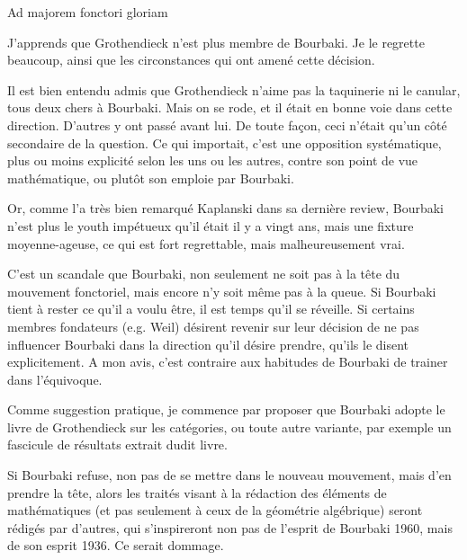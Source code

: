 \begin{center}Ad majorem fonctori gloriam\end{center}

J'apprends que Grothendieck n'est plus membre de Bourbaki. Je le regrette
beaucoup, ainsi que les circonstances qui ont amené cette décision.

Il est bien entendu admis que Grothendieck n'aime pas la taquinerie ni le
canular, tous deux chers à Bourbaki. Mais on se rode, et il était en bonne
voie dans cette direction. D'autres y ont passé avant lui. De toute façon,
ceci n'était qu'un côté secondaire de la question. Ce qui importait, c'est
une opposition systématique, plus ou moins explicité selon les uns ou les
autres, contre son point de vue mathématique, ou plutôt son emploie par
Bourbaki.

Or, comme l'a très bien remarqué Kaplanski dans sa dernière review,
Bourbaki n'est plus le youth impétueux qu'il était il y a vingt ans, mais une
fixture moyenne-ageuse, ce qui est fort regrettable, mais malheureusement vrai.

C'est un scandale que Bourbaki, non seulement ne soit pas à la tête du
mouvement fonctoriel, mais encore n'y soit même pas à la queue. Si Bourbaki
tient à rester ce qu'il a voulu être, il est temps qu'il se réveille. Si
certains membres fondateurs (e.g. Weil) désirent revenir sur leur décision de
ne pas influencer Bourbaki dans la direction qu'il désire prendre, qu'ils le
disent explicitement. A mon avis, c'est contraire aux habitudes de Bourbaki
de trainer dans l'équivoque.

Comme suggestion pratique, je commence par proposer que Bourbaki adopte
le livre de Grothendieck sur les catégories, ou toute autre variante, par
exemple un fascicule de résultats extrait dudit livre.

Si Bourbaki refuse, non pas de se mettre dans le nouveau mouvement, mais
d'en prendre la tête, alors les traités visant à la rédaction des éléments de
mathématiques (et pas seulement à ceux de la géométrie algébrique) seront
rédigés par d'autres, qui s'inspireront non pas de l'esprit de Bourbaki 1960,
mais de son esprit 1936. Ce serait dommage.

